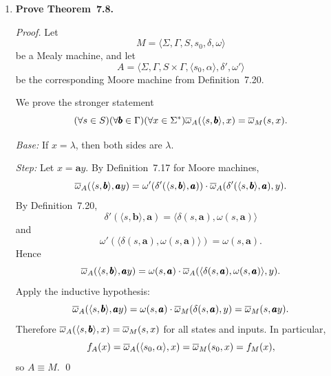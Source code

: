 \begin{enumerate}[{7.}1.]
\begin{proof}
We prove by induction on $|x|$ that
\[
  (\forall s\in S)(\forall x\in\Sigma^*) 
  \OBAR_M(s,x)=\OBAR_A(s,x).
\]

\emph{Base:} If $x=\lambda$, then both sides equal $\lambda$.

\emph{Step:} Let $x=\pmb{a}y$.  Then
\[
  \OBAR_M(s,\pmb{a}y)
  =\omega'(s,\pmb{a})\cdot\OBAR_M(\delta(s,\pmb{a}),y)
  =\omega(\delta(s,\pmb{a}))\cdot\OBAR_M(\delta(s,\pmb{a}),y).
\]
By the inductive hypothesis applied to the state $\delta(s,\pmb{a})$,
\[
  \OBAR_M(s,\pmb{a}y)
  =\omega(\delta(s,\pmb{a}))\cdot\OBAR_A(\delta(s,\pmb{a}),y)
  =\OBAR_A(s,\pmb{a}y),
\]
by Definition~7.17.  Therefore $\OBAR_M(s,x)=\OBAR_A(s,x)$ for all $s$ and
$x$.  In particular,
$f_M(x)=\OBAR_M(s_0,x)=\OBAR_A(s_0,x)=f_A(x)$, so $M\equiv A$. \qed
\end{proof}

\item \textbf{Prove Theorem~7.8.}

\begin{proof}
Let
\[
  M=\langle\Sigma,\Gamma,S,s_0,\delta,\omega\rangle
\]
be a Mealy machine, and let
\[
  A=\langle\Sigma,\Gamma,S\times\Gamma,\langle s_0,\alpha\rangle,\delta',\omega'\rangle
\]
be the corresponding Moore machine from Definition~7.20.

We prove the stronger statement
\[
  (\forall s\in S)(\forall \pmb{b}\in\Gamma)(\forall x\in\Sigma^*) 
  \overline{\omega}_A(\langle s,\pmb{b}\rangle,x)=\overline{\omega}_M(s,x).
\]

\emph{Base:} If $x=\lambda$, then both sides are $\lambda$.

\emph{Step:} Let $x=\pmb{a}y$.  By Definition~7.17 for Moore machines,
\[
  \overline{\omega}_A(\langle s,\pmb{b}\rangle,\pmb{a}y)
  =\omega'(\delta'(\langle s,\pmb{b}\rangle,\pmb{a}))\cdot
    \overline{\omega}_A(\delta'(\langle s,\pmb{b}\rangle,\pmb{a}),y).
\]
By Definition~7.20,
\[
  \delta'(\langle s,\pmb{b}\rangle,\pmb{a})
  =\langle\delta(s,\pmb{a}),\omega(s,\pmb{a})\rangle
\]
and
\[
  \omega'(\langle\delta(s,\pmb{a}),\omega(s,\pmb{a})\rangle)=\omega(s,\pmb{a}).
\]
Hence
\[
  \overline{\omega}_A(\langle s,\pmb{b}\rangle,\pmb{a}y)
  =\omega(s,\pmb{a})\cdot
    \overline{\omega}_A(\langle\delta(s,\pmb{a}),\omega(s,\pmb{a})\rangle,y).
\]
Apply the inductive hypothesis:
\[
  \overline{\omega}_A(\langle s,\pmb{b}\rangle,\pmb{a}y)
  =\omega(s,\pmb{a})\cdot\overline{\omega}_M(\delta(s,\pmb{a}),y)
  =\overline{\omega}_M(s,\pmb{a}y).
\]
Therefore $\overline{\omega}_A(\langle s,\pmb{b}\rangle,x)=\overline{\omega}_M(s,x)$ for all states and
inputs.  In particular,
\[
  f_A(x)=\overline{\omega}_A(\langle s_0,\alpha\rangle,x)=\overline{\omega}_M(s_0,x)=f_M(x),
\]
so $A\equiv M$. \qed
\end{proof}


\end{enumerate}
